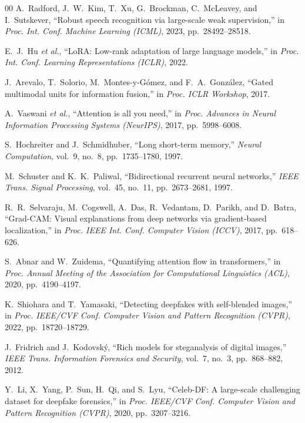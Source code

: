 \documentclass[conference]{IEEEtran}
\begin{document}
\begin{thebibliography}{00}
A.~Radford, J.~W.~Kim, T.~Xu, G.~Brockman, C.~McLeavey, and I.~Sutskever,
``Robust speech recognition via large-scale weak supervision,'' in
\emph{Proc. Int. Conf. Machine Learning (ICML)}, 2023, pp.~28492--28518.

E.~J.~Hu \emph{et al.}, ``LoRA: Low-rank adaptation of large language
models,'' in \emph{Proc. Int. Conf. Learning Representations (ICLR)}, 2022.

J.~Arevalo, T.~Solorio, M.~Montes-y-G\'{o}mez, and F.~A.~Gonz\'{a}lez,
``Gated multimodal units for information fusion,'' in \emph{Proc. ICLR
Workshop}, 2017.

A.~Vaswani \emph{et al.}, ``Attention is all you need,'' in \emph{Proc.
Advances in Neural Information Processing Systems (NeurIPS)}, 2017,
pp.~5998--6008.

S.~Hochreiter and J.~Schmidhuber, ``Long short-term memory,'' \emph{Neural
Computation}, vol.~9, no.~8, pp.~1735--1780, 1997.

M.~Schuster and K.~K.~Paliwal, ``Bidirectional recurrent neural networks,''
\emph{IEEE Trans. Signal Processing}, vol.~45, no.~11, pp.~2673--2681, 1997.

R.~R.~Selvaraju, M.~Cogswell, A.~Das, R.~Vedantam, D.~Parikh, and D.~Batra,
``Grad-CAM: Visual explanations from deep networks via gradient-based
localization,'' in \emph{Proc. IEEE Int. Conf. Computer Vision (ICCV)},
2017, pp.~618--626.

S.~Abnar and W.~Zuidema, ``Quantifying attention flow in transformers,''
in \emph{Proc. Annual Meeting of the Association for Computational
Linguistics (ACL)}, 2020, pp.~4190--4197.

K.~Shiohara and T.~Yamasaki, ``Detecting deepfakes with self-blended
images,'' in \emph{Proc. IEEE/CVF Conf. Computer Vision and Pattern
Recognition (CVPR)}, 2022, pp.~18720--18729.

J.~Fridrich and J.~Kodovsk\'{y}, ``Rich models for steganalysis of digital
images,'' \emph{IEEE Trans. Information Forensics and Security}, vol.~7,
no.~3, pp.~868--882, 2012.

Y.~Li, X.~Yang, P.~Sun, H.~Qi, and S.~Lyu, ``Celeb-DF: A large-scale
challenging dataset for deepfake forensics,'' in \emph{Proc. IEEE/CVF
Conf. Computer Vision and Pattern Recognition (CVPR)}, 2020, pp.~3207--3216.


\end{thebibliography}
\end{document}

